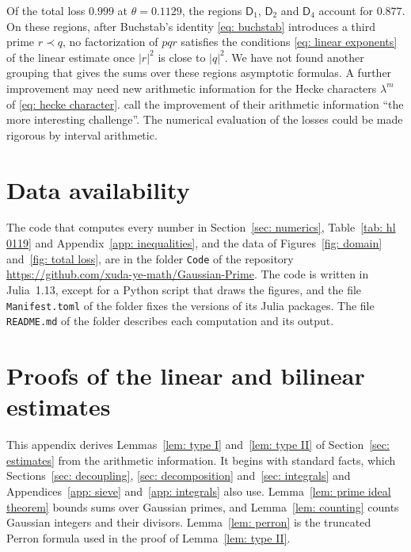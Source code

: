 \documentclass{article}
\numberwithin{equation}{section}
\begin{document}
Of the total loss $0.999$ at $\theta = 0.1129$, the regions $\mathsf{D}_1$, $\mathsf{D}_2$ and $\mathsf{D}_4$ account for $0.877$. On these regions, after Buchstab's identity \eqref{eq: buchstab} introduces a third prime $r \prec q$, no factorization of $pqr$ satisfies the conditions \eqref{eq: linear exponents} of the linear estimate once $|r|^2$ is close to $|q|^2$. We have not found another grouping that gives the sums over these regions asymptotic formulas. A further improvement may need new arithmetic information for the Hecke characters $\lambda^m$ of \eqref{eq: hecke character}. \citet[p.~134]{harman2001gaussian} call the improvement of their arithmetic information ``the more interesting challenge''. The numerical evaluation of the losses could be made rigorous by interval arithmetic.

\section*{Data availability}

The code that computes every number in Section~\ref{sec: numerics}, Table~\ref{tab: hl 0119} and Appendix~\ref{app: inequalities}, and the data of Figures~\ref{fig: domain} and~\ref{fig: total loss}, are in the folder \texttt{Code} of the repository \url{https://github.com/xuda-ye-math/Gaussian-Prime}. The code is written in Julia~1.13, except for a Python script that draws the figures, and the file \texttt{Manifest.toml} of the folder fixes the versions of its Julia packages. The file \texttt{README.md} of the folder describes each computation and its output.

\appendix

\section{Proofs of the linear and bilinear estimates}
\label{app: arithmetic}
\label{sec: arithmetic}

This appendix derives Lemmas~\ref{lem: type I} and~\ref{lem: type II} of Section~\ref{sec: estimates} from the arithmetic information. It begins with standard facts, which Sections~\ref{sec: decoupling}, \ref{sec: decomposition} and~\ref{sec: integrals} and Appendices~\ref{app: sieve} and~\ref{app: integrals} also use. Lemma~\ref{lem: prime ideal theorem} bounds sums over Gaussian primes, and Lemma~\ref{lem: counting} counts Gaussian integers and their divisors. Lemma~\ref{lem: perron} is the truncated Perron formula used in the proof of Lemma~\ref{lem: type II}.
\end{document}
